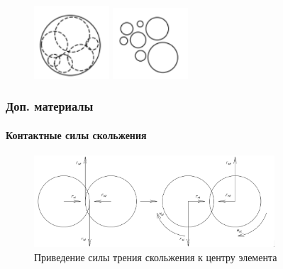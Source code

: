 \documentclass[c]{beamer}  %
\begin{document}
\begin{frame}

\begin{figure}[h!]
	\centering
	\includegraphics[width=0.25\textwidth]{break_before}
	\includegraphics[width=0.25\textwidth]{break_after}
\end{figure} 
\end{frame}


\begin{frame}
\frametitle{Доп. материалы} 
\framesubtitle{Контактные силы скольжения}

\begin{figure}[h!]
	\centering
	\includegraphics[width=0.8\textwidth]{fs_ms}
	\caption{Приведение силы трения скольжения к центру элемента}
	\label{pic:fs_ms}
\end{figure} 
\end{frame}






 
\end{document}
